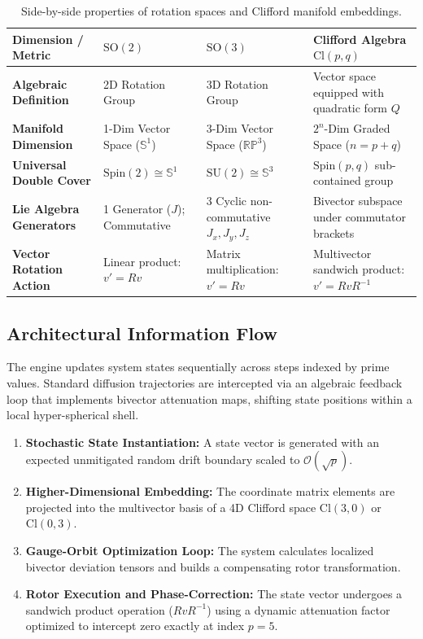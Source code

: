 \documentclass[11pt,fleqn]{article}
\begin{document}
\begin{table}[h!]
\centering
\small
\begin{tabular}{llll}
\toprule
\textbf{Dimension / Metric} & $\text{SO}(2)$ & $\text{SO}(3)$ & \textbf{Clifford Algebra} $\text{Cl}(p,q)$ \\
\midrule
\textbf{Algebraic Definition} & 2D Rotation Group & 3D Rotation Group & Vector space equipped with quadratic form $Q$ \\
\textbf{Manifold Dimension} & 1-Dim Vector Space ($\mathbb{S}^1$) & 3-Dim Vector Space ($\mathbb{RP}^3$) & $2^n$-Dim Graded Space ($n=p+q$) \\
\textbf{Universal Double Cover} & $\text{Spin}(2) \cong \mathbb{S}^1$ & $\text{SU}(2) \cong \mathbb{S}^3$ & $\text{Spin}(p,q)$ sub-contained group \\
\textbf{Lie Algebra Generators} & 1 Generator ($J$); Commutative & 3 Cyclic non-commutative $J_x,J_y,J_z$ & Bivector subspace under commutator brackets \\
\textbf{Vector Rotation Action} & Linear product: $v' = Rv$ & Matrix multiplication: $v'=Rv$ & Multivector sandwich product: $v' = R v R^{-1}$ \\
\bottomrule
\end{tabular}
\caption{Side-by-side properties of rotation spaces and Clifford manifold embeddings.}
\end{table}

\subsection{Architectural Information Flow}
The engine updates system states sequentially across steps indexed by prime values. Standard diffusion trajectories are intercepted via an algebraic feedback loop that implements bivector attenuation maps, shifting state positions within a local hyper-spherical shell.
\begin{enumerate}
    \item \textbf{Stochastic State Instantiation:} A state vector is generated with an expected unmitigated random drift boundary scaled to $\mathcal{O}(\sqrt{p})$.
    \item \textbf{Higher-Dimensional Embedding:} The coordinate matrix elements are projected into the multivector basis of a 4D Clifford space $\text{Cl}(3,0)$ or $\text{Cl}(0,3)$.
    \item \textbf{Gauge-Orbit Optimization Loop:} The system calculates localized bivector deviation tensors and builds a compensating rotor transformation.
    \item \textbf{Rotor Execution and Phase-Correction:} The state vector undergoes a sandwich product operation ($R v R^{-1}$) using a dynamic attenuation factor optimized to intercept zero exactly at index $p = 5$.
\end{enumerate}
\end{document}
